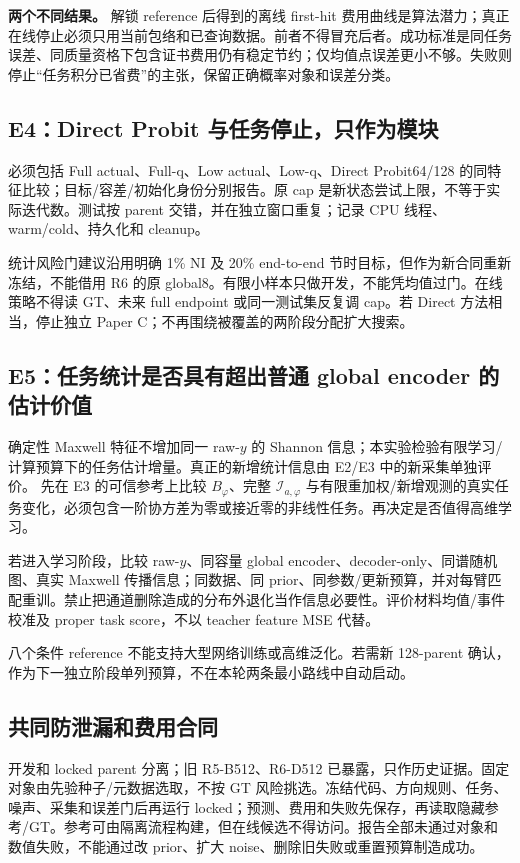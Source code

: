 \textbf{两个不同结果。} 解锁 reference 后得到的离线 first-hit 费用曲线是算法潜力；真正在线停止必须只用当前包络和已查询数据。前者不得冒充后者。成功标准是同任务误差、同质量资格下包含证书费用仍有稳定节约；仅均值点误差更小不够。失败则停止“任务积分已省费”的主张，保留正确概率对象和误差分类。

\subsection{E4：Direct Probit 与任务停止，只作为模块}
必须包括 Full actual、Full-q、Low actual、Low-q、Direct Probit64/128 的同特征比较；目标/容差/初始化身份分别报告。原 cap 是新状态尝试上限，不等于实际迭代数。测试按 parent 交错，并在独立窗口重复；记录 CPU 线程、warm/cold、持久化和 cleanup。

统计风险门建议沿用明确 1\% NI 及 20\% end-to-end 节时目标，但作为新合同重新冻结，不能借用 R6 的原 global8。有限小样本只做开发，不能凭均值过门。在线策略不得读 GT、未来 full endpoint 或同一测试集反复调 cap。若 Direct 方法相当，停止独立 Paper C；不再围绕被覆盖的两阶段分配扩大搜索。

\subsection{E5：任务统计是否具有超出普通 global encoder 的估计价值}
确定性 Maxwell 特征不增加同一 raw-$y$ 的 Shannon 信息；本实验检验有限学习/计算预算下的任务估计增量。真正的新增统计信息由 E2/E3 中的新采集单独评价。
先在 E3 的可信参考上比较 $B_\varphi$、完整 $\mathcal I_{a,\varphi}$ 与有限重加权/新增观测的真实任务变化，必须包含一阶协方差为零或接近零的非线性任务。再决定是否值得高维学习。

若进入学习阶段，比较 raw-$y$、同容量 global encoder、decoder-only、同谱随机图、真实 Maxwell 传播信息；同数据、同 prior、同参数/更新预算，并对每臂匹配重训。禁止把通道删除造成的分布外退化当作信息必要性。评价材料均值/事件校准及 proper task score，不以 teacher feature MSE 代替。

八个条件 reference 不能支持大型网络训练或高维泛化。若需新 128-parent 确认，作为下一独立阶段单列预算，不在本轮两条最小路线中自动启动。

\subsection{共同防泄漏和费用合同}
开发和 locked parent 分离；旧 R5-B512、R6-D512 已暴露，只作历史证据。固定对象由先验种子/元数据选取，不按 GT 风险挑选。冻结代码、方向规则、任务、噪声、采集和误差门后再运行 locked；预测、费用和失败先保存，再读取隐藏参考/GT。参考可由隔离流程构建，但在线候选不得访问。报告全部未通过对象和数值失败，不能通过改 prior、扩大 noise、删除旧失败或重置预算制造成功。

